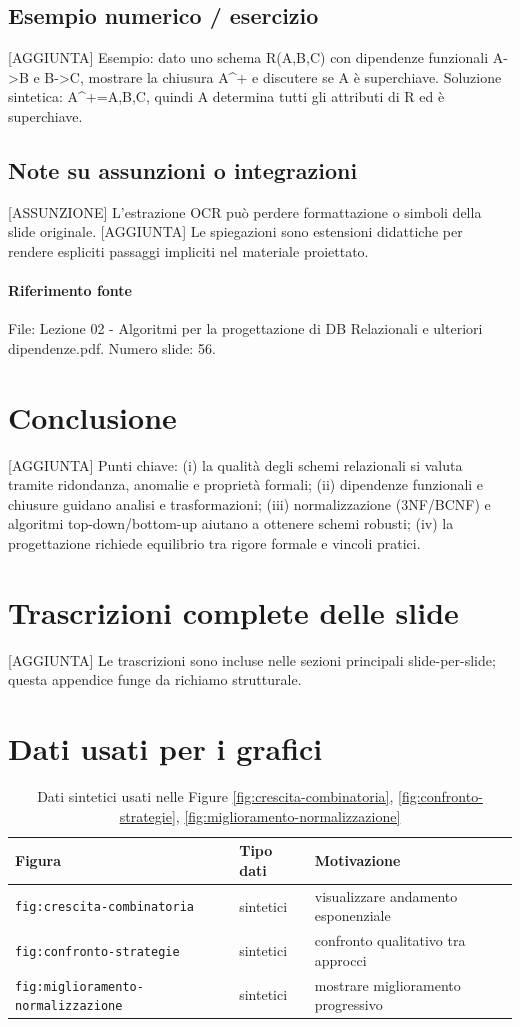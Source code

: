 \documentclass[11pt]{article}
\begin{document}
\subsection*{Esempio numerico / esercizio}
[AGGIUNTA] Esempio: dato uno schema R(A,B,C) con dipendenze funzionali A->B e B->C, mostrare la chiusura A^+ e discutere se A è superchiave. Soluzione sintetica: A^+={A,B,C}, quindi A determina tutti gli attributi di R ed è superchiave.
\subsection*{Note su assunzioni o integrazioni}
[ASSUNZIONE] L'estrazione OCR può perdere formattazione o simboli della slide originale.
[AGGIUNTA] Le spiegazioni sono estensioni didattiche per rendere espliciti passaggi impliciti nel materiale proiettato.
\paragraph{Riferimento fonte} File: Lezione 02 - Algoritmi per la progettazione di DB Relazionali e ulteriori dipendenze.pdf. Numero slide: 56.
\section{Conclusione}
[AGGIUNTA] Punti chiave: (i) la qualità degli schemi relazionali si valuta tramite ridondanza, anomalie e proprietà formali; (ii) dipendenze funzionali e chiusure guidano analisi e trasformazioni; (iii) normalizzazione (3NF/BCNF) e algoritmi top-down/bottom-up aiutano a ottenere schemi robusti; (iv) la progettazione richiede equilibrio tra rigore formale e vincoli pratici.
\appendix
\section{Trascrizioni complete delle slide}
[AGGIUNTA] Le trascrizioni sono incluse nelle sezioni principali slide-per-slide; questa appendice funge da richiamo strutturale.
\section{Dati usati per i grafici}
\begin{table}[ht]
\centering
\caption{Dati sintetici usati nelle Figure \ref{fig:crescita-combinatoria}, \ref{fig:confronto-strategie}, \ref{fig:miglioramento-normalizzazione}}
\label{tab:dati-grafici-riepilogo}
\begin{tabular}{@{}lll@{}}
\toprule
Figura & Tipo dati & Motivazione \\
\midrule
\texttt{fig:crescita-combinatoria} & sintetici & visualizzare andamento esponenziale \\
\texttt{fig:confronto-strategie} & sintetici & confronto qualitativo tra approcci \\
\texttt{fig:miglioramento-normalizzazione} & sintetici & mostrare miglioramento progressivo \\
\bottomrule
\end{tabular}
\end{table}
\end{document}
